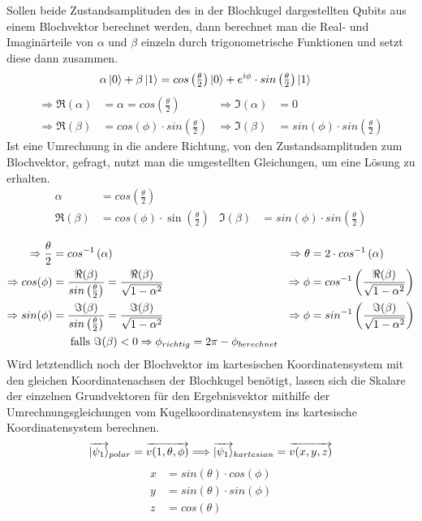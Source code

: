 \documentclass[12pt]{report}
\begin{document}
	Sollen beide Zustandsamplituden des in der Blochkugel dargestellten Qubits aus einem Blochvektor berechnet werden, dann berechnet man die Real- und Imaginärteile von $\alpha$ und $\beta$ einzeln durch trigonometrische Funktionen und setzt diese dann zusammen.
	\begin{align}
		 \alpha\ket{0} + \beta\ket{1} &= cos\left(\tfrac{\theta}{2}\right)\ket{0} + e^{i\phi}\cdot sin\left(\tfrac{\theta}{2}\right)\ket{1}
	\end{align}
	\begin{align*}
		 \Rightarrow\Re(\alpha) &= \alpha = cos\left(\frac{\theta}{2}\right) &
		 \Rightarrow\Im(\alpha) &= 0 \\
		 \Rightarrow\Re(\beta) &= cos(\phi)\cdot sin\left(\frac{\theta}{2}\right) & 
		 \Rightarrow\Im(\beta) &= sin(\phi)\cdot sin\left(\frac{\theta}{2}\right)
	\end{align*}
	Ist eine Umrechnung in die andere Richtung, von den Zustandsamplituden zum Blochvektor, gefragt, nutzt man die umgestellten Gleichungen, um eine Lösung zu erhalten.	
	\begin{align}
		 \alpha &= cos\left(\tfrac{\theta}{2}\right) \\
		 \Re(\beta) &= cos(\phi)\cdot\sin\left(\tfrac{\theta}{2}\right) & \Im(\beta) &= sin(\phi)\cdot sin\left(\tfrac{\theta}{2}\right)
	\end{align}

\newpage
	
	\begin{align*}
		 \Rightarrow \frac{\theta}{2} &= cos^{-1}\left( \alpha \right) & \Rightarrow \theta &= 2\cdot cos^{-1}\left( \alpha \right) \\
		 \Rightarrow cos(\phi) &= \frac{\Re(\beta)}{sin\left( \frac{\theta}{2} \right)} = \frac{\Re(\beta)}{\sqrt{1-\alpha^2}} & \Rightarrow \phi &= cos^{-1}\left( \frac{\Re(\beta)}{\sqrt{1-\alpha^2}} \right)\\
		 \Rightarrow sin(\phi) &= \frac{\Im(\beta)}{sin\left( \frac{\theta}{2} \right)} = \frac{\Im(\beta)}{\sqrt{1-\alpha^2}} & \Rightarrow \phi &= sin^{-1}\left( \frac{\Im(\beta)}{\sqrt{1-\alpha^2}} \right)\\
		 & \text{\hspace{0.45cm} falls } \Im(\beta)<0\Rightarrow\phi_{richtig} = 2 \pi - \phi_{berechnet}
	\end{align*}
	Wird letztendlich noch der Blochvektor im kartesischen Koordinatensystem mit den gleichen Koordinatenachsen der Blochkugel benötigt, lassen sich die Skalare der einzelnen Grundvektoren für den Ergebnisvektor mithilfe der Umrechnungsgleichungen vom Kugelkoordinatensystem ins kartesische Koordinatensystem berechnen.
		\[ \overrightarrow{\ket{\psi_1}}_{polar} = \overrightarrow{v(1,\theta,\phi)} \Longrightarrow \overrightarrow{\ket{\psi_1}}_{kartesian} = \overrightarrow{v(x,y,z)} \]
		\vspace{-1cm}
	\begin{align*}
		 x &= sin(\theta)\cdot cos(\phi)\\
		 y &= sin(\theta)\cdot sin(\phi)\\
		 z &= cos(\theta)
	\end{align*}
\end{document}
